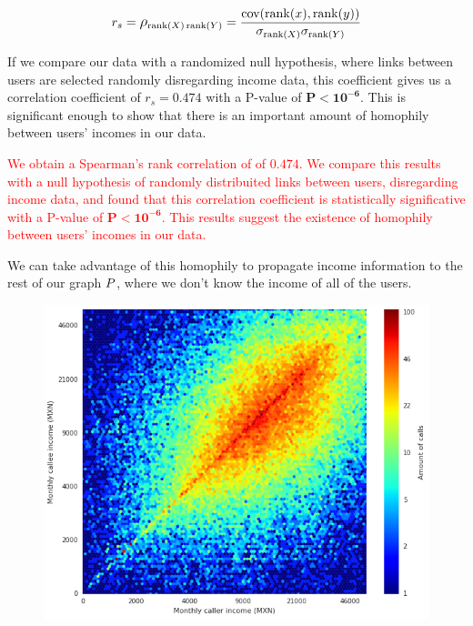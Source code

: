 \[
r_s = \mathlarger{\rho}_{\operatorname{rank}(X) \operatorname{rank}(Y)} = \frac{\operatorname{cov}(\operatorname{rank}(x), \operatorname{rank}(y))}{\sigma_{\operatorname{rank}(X)} \sigma_{\operatorname{rank}(Y)}}
\]

If we compare our data with a randomized null hypothesis, where links between users are selected randomly disregarding income data, this coefficient gives us a correlation coefficient of $r_s = \mathbf{0.474} $ with a P-value of $ \mathbf{P < 10^{-6}} $. This is significant enough to show that there is an important amount of homophily between users' incomes in our data.

\textcolor{Red}{
 We obtain a Spearman's rank correlation of of $ \mathbf{0.474} $. We compare this results with a null hypothesis of randomly distribuited links between users, disregarding income data, and found that this correlation coefficient is statistically significative with a P-value of $ \mathbf{P < 10^{-6}} $. This results suggest the existence of homophily between users' incomes in our data.
}

We can take advantage of this homophily to propagate income information to the rest of our graph $ \mathlarger{P} $, where we don't know the income of all of the users.

\begin{figure}[h]
\begin{center}
\includegraphics[width=1\columnwidth]{figures/Homophily_income_origin_target_1/Homophily_income_origin_target_1.png}
\caption{ \protect}
\label{homophily_heatmap}
\end{center}
\end{figure}

